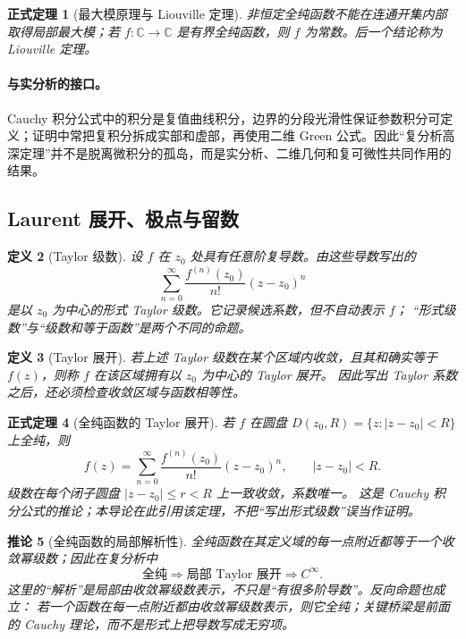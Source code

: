 \documentclass[UTF8,fontset=none,a4paper,11pt]{ctexart}
\theoremstyle{foundation-definition}
\newtheorem{definition}{定义}[section]
\theoremstyle{foundation-theorem}
\newtheorem{theorem}[definition]{正式定理}
\theoremstyle{foundation-proposition}
\theoremstyle{foundation-example}
\theoremstyle{foundation-remark}
\theoremstyle{foundation-theorem}
\newtheorem{corollary}[definition]{推论}
\newcommand{\C}{\mathbb C}
\begin{document}
\begin{theorem}[最大模原理与 Liouville 定理]
非恒定全纯函数不能在连通开集内部取得局部最大模；若 \(f:\C\to\C\) 是有界全纯函数，则 \(f\) 为常数。后一个结论称为 Liouville 定理。
\end{theorem}

\paragraph{与实分析的接口。}
Cauchy 积分公式中的积分是复值曲线积分，边界的分段光滑性保证参数积分可定义；证明中常把复积分拆成实部和虚部，再使用二维 Green 公式。因此“复分析高深定理”并不是脱离微积分的孤岛，而是实分析、二维几何和复可微性共同作用的结果。

\subsection{Laurent 展开、极点与留数}

\begin{definition}[Taylor 级数]\label{def:taylor-series}
设 \(f\) 在 \(z_0\) 处具有任意阶复导数。由这些导数写出的
\[
 \sum_{n=0}^{\infty}\frac{f^{(n)}(z_0)}{n!}(z-z_0)^n
\]
是以 \(z_0\) 为中心的形式 Taylor 级数。它记录候选系数，但不自动表示 \(f\)；
“形式级数”与“级数和等于函数”是两个不同的命题。
\end{definition}

\begin{definition}[Taylor 展开]\label{def:taylor-expansion}
若上述 Taylor 级数在某个区域内收敛，且其和确实等于
\(f(z)\)，则称 \(f\) 在该区域拥有以 \(z_0\) 为中心的 Taylor 展开。
因此写出 Taylor 系数之后，还必须检查收敛区域与函数相等性。
\end{definition}

\begin{theorem}[全纯函数的 Taylor 展开]\label{thm:taylor-expansion}
若 \(f\) 在圆盘 \(D(z_0,R)=\{z:|z-z_0|<R\}\) 上全纯，则
\[
 f(z)=\sum_{n=0}^{\infty}\frac{f^{(n)}(z_0)}{n!}(z-z_0)^n,
 \qquad |z-z_0|<R.
\]
级数在每个闭子圆盘 \(|z-z_0|\le r<R\) 上一致收敛，系数唯一。
这是 Cauchy 积分公式的推论；本导论在此引用该定理，不把“写出形式级数”误当作证明。
\end{theorem}

\begin{corollary}[全纯函数的局部解析性]\label{cor:holomorphic-analytic}
全纯函数在其定义域的每一点附近都等于一个收敛幂级数；因此在复分析中
\[
\text{全纯}\Longrightarrow\text{局部 Taylor 展开}\Longrightarrow C^\infty.
\]
这里的“解析”是局部由收敛幂级数表示，不只是“有很多阶导数”。反向命题也成立：
若一个函数在每一点附近都由收敛幂级数表示，则它全纯；关键桥梁是前面的 Cauchy
理论，而不是形式上把导数写成无穷项。
\end{corollary}
\end{document}
